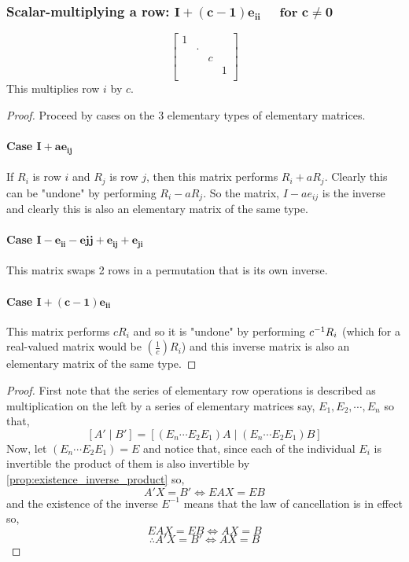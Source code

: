 \documentclass[MathsNotesBase.tex]{subfiles}
\begin{document}
{		\subsubsection*{Scalar-multiplying a row: $\bm{ I + (c - 1)e_{ii}\;\;\;\; \text{ for } c \neq 0 }$}
			\[
			\begin{bmatrix}
			1 	&  &  	&	\\
			 	& \cdot &  & \\
			 	&  & c 	& 	\\
			 	&  & 	& 1	\\
			\end{bmatrix}
			\]
			This multiplies row $i$ by $c$.
		
		\bigskip	
		\begin{proof} Proceed by cases on the 3 elementary types of elementary matrices.
		~\paragraph{Case $\bm{ I + ae_{ij} }$}  If $R_i$ is row $i$ and $R_j$ is row $j$, then this matrix performs $R_i + aR_j$. Clearly this can be "undone" by performing $R_i - aR_j$. So the matrix, $I - ae_{ij}$ is the inverse and clearly this is also an elementary matrix of the same type.
		\paragraph{Case $\bm{ I - e_{ii} - e{jj} + e_{ij} + e_{ji} }$} This matrix swaps 2 rows in a permutation that is its own inverse.
		\paragraph{Case $\bm{ I + (c - 1)e_{ii} }$} This matrix performs $cR_i$ and so it is "undone" by performing ${c}^{-1}R_i$ (which for a real-valued matrix would be $\left(\frac{1}{c}\right)R_i$) and this inverse matrix is also an elementary matrix of the same type. 
		\end{proof}
		
		\bigskip
		\begin{proof}
		First note that the series of elementary row operations is described as multiplication on the left by a series of elementary matrices say, $E_1, E_2, \cdots , E_n$ so that,
		\[ [A' \;\vert\; B'] = [(E_n\cdots E_2E_1)A \;\vert\; (E_n\cdots E_2E_1)B] \]
		Now, let $(E_n\cdots E_2E_1) = E$ and notice that, since each of the individual $E_i$ is invertible the product of them is also invertible by \autoref{prop:existence_inverse_product} so,
		\[ A'X = B' \iff EAX = EB \]
		and the existence of the inverse $E^{-1}$ means that the law of cancellation is in effect so,
		\[ EAX = EB \iff AX = B \]
		\[ \therefore A'X = B' \iff AX = B \]
		\end{proof}
		
}
\end{document}
